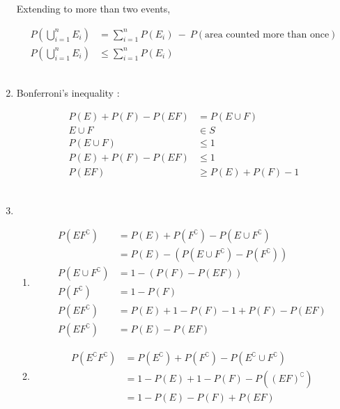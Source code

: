 \begin{enumerate}
		Extending to more than two events,
		
		\begin{align}
			P \left( \bigcup_{i = 1}^{n} E_i \right) &= \sum\limits_{i = 1}^{n} P(E_i) \ - \ P(\text{area counted more than once}) \\
			P \left( \bigcup_{i = 1}^{n} E_i \right) &\leq \sum\limits_{i = 1}^{n} P(E_i)
		\end{align}
	\\
	
	\item Bonferroni's inequality : 
	
		\begin{align}
			P(E) + P(F) - P(EF)  &= P(E \cup F) \\
			E \cup F &\in S\\
			P(E \cup F) &\leq 1 \\
			P(E) + P(F) - P(EF) &\leq 1 \\
			P(EF) &\geq P(E) + P(F) - 1
		\end{align}
	 \\
	
	\item	\begin{enumerate}
		\item 
		
		
			\begin{align}
				P(E F^\complement) &= P(E) + P(F^\complement) - P(E \cup F^\complement) \\
				&= P(E) - (P(E \cup F^\complement) - P(F^\complement)) \\
				P(E \cup F^\complement) &= 1 - (P(F) - P(EF)) \\
				P(F^\complement) &= 1 - P(F) \\
				P(E F^\complement) &= P(E) + 1 - P(F) - 1 +  P(F) - P(EF) \\
				P(E F^\complement) &= P(E) - P(EF)
			\end{align}
			\item 
			\begin{align}
				P(E^\complement F^\complement) &= P(E^\complement) + P(F^\complement) - P(E^\complement \cup F^\complement) \\
				&= 1 - P(E) + 1 - P(F) - P((EF)^\complement) \\
				&= 1 - P(E) - P(F) + P(EF)
			\end{align}
			
		 
	\end{enumerate} 
	

\end{enumerate}
